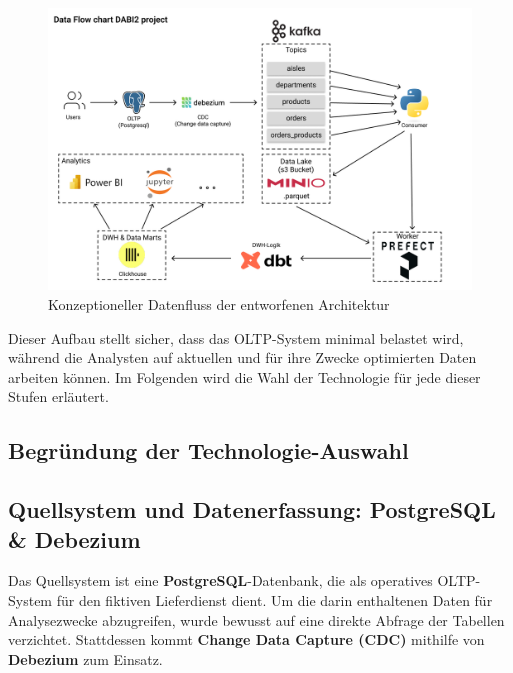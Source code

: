\documentclass[
    12pt,               
    a4paper,        
    ngerman            
]{scrartcl}
\begin{document}
\begin{figure}[h!]
    \centering
    \includegraphics[width=\textwidth]{datenfluss.png}
    \caption{Konzeptioneller Datenfluss der entworfenen Architektur}
    \label{fig:architektur_diagramm}
\end{figure}

Dieser Aufbau stellt sicher, dass das OLTP-System minimal belastet wird, während die Analysten auf aktuellen und für ihre Zwecke optimierten Daten arbeiten können. Im Folgenden wird die Wahl der Technologie für jede dieser Stufen erläutert.

\subsection{Begründung der Technologie-Auswahl}
\label{sec:technologie_auswahl}

\subsection{Quellsystem und Datenerfassung: PostgreSQL \& Debezium}
\label{subsec:postgres_debezium}

Das Quellsystem ist eine \textbf{PostgreSQL}-Datenbank, die als operatives OLTP-System für den fiktiven Lieferdienst dient. Um die darin enthaltenen Daten für Analysezwecke abzugreifen, wurde bewusst auf eine direkte Abfrage der Tabellen verzichtet. Stattdessen kommt \textbf{Change Data Capture (CDC)} mithilfe von \textbf{Debezium} zum Einsatz.
\end{document}
